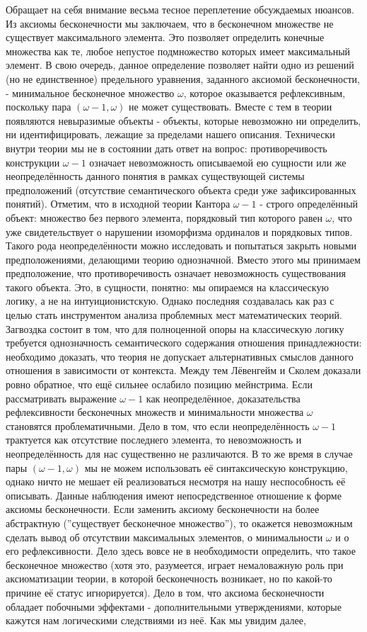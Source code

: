 \documentclass[12pt]{article}
\begin{document}
Обращает на себя внимание весьма тесное переплетение обсуждаемых нюансов. Из аксиомы бесконечности мы заключаем, что в бесконечном множестве не существует максимального элемента. Это позволяет определить конечные множества как те, любое непустое подмножество которых имеет максимальный элемент. В свою очередь, данное определение позволяет найти одно из решений (но не единственное) предельного уравнения, заданного аксиомой бесконечности, - минимальное бесконечное множество $\omega$, которое оказывается рефлексивным, поскольку пара $(\omega - 1, \omega)$ не может существовать. Вместе с тем в теории появляются невыразимые объекты - объекты, которые невозможно ни определить, ни идентифицировать, лежащие за пределами нашего описания. Технически внутри теории мы не в состоянии дать ответ на вопрос: противоречивость конструкции $\omega - 1$ означает невозможность описываемой ею сущности или же неопределённость данного понятия в рамках существующей системы предположений (отсутствие семантического объекта среди уже зафиксированных понятий). Отметим, что в исходной теории Кантора $\omega - 1$ - строго определённый объект: множество без первого элемента, порядковый тип которого равен $\omega$, что уже свидетельствует о нарушении изоморфизма ординалов и порядковых типов. Такого рода неопределённости можно исследовать и попытаться закрыть новыми предположениями, делающими теорию однозначной. Вместо этого мы принимаем предположение, что противоречивость означает невозможность существования такого объекта. Это, в сущности, понятно: мы опираемся на классическую логику, а не на интуиционистскую. Однако последняя создавалась как раз с целью стать инструментом анализа проблемных мест математических теорий. Загвоздка состоит в том, что для полноценной опоры на классическую логику требуется однозначность семантического содержания отношения принадлежности: необходимо доказать, что теория не допускает альтернативных смыслов данного отношения в зависимости от контекста. Между тем Лёвенгейм и Сколем доказали ровно обратное, что ещё сильнее ослабило позицию мейнстрима. Если рассматривать выражение $\omega - 1$ как неопределённое, доказательства рефлексивности бесконечных множеств и минимальности множества $\omega$ становятся проблематичными. Дело в том, что если неопределённость $\omega - 1$ трактуется как отсутствие последнего элемента, то невозможность и неопределённость для нас существенно не различаются. В то же время в случае пары $(\omega - 1, \omega)$ мы не можем использовать её синтаксическую конструкцию, однако ничто не мешает ей реализоваться несмотря на нашу неспособность её описывать. Данные наблюдения имеют непосредственное отношение к форме аксиомы бесконечности. Если заменить аксиому бесконечности на более абстрактную (''существует бесконечное множество''), то окажется невозможным сделать вывод об отсутствии максимальных элементов, о минимальности $\omega$ и о его рефлексивности. Дело здесь вовсе не в необходимости определить, что такое бесконечное множество (хотя это, разумеется, играет немаловажную роль при аксиоматизации теории, в которой бесконечность возникает, но по какой-то причине её статус игнорируется). Дело в том, что аксиома бесконечности обладает побочными эффектами - дополнительными утверждениями, которые кажутся нам логическими следствиями из неё. Как мы увидим далее, 
\end{document}
